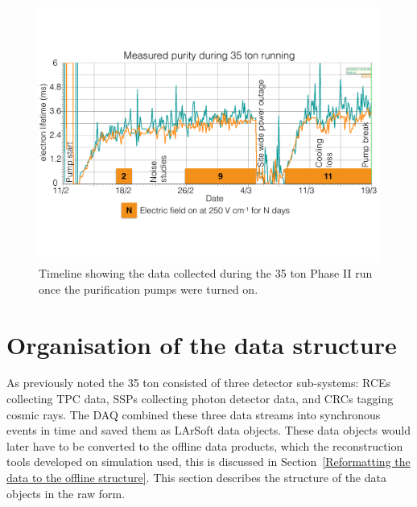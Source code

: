 \begin{figure}[h!]
  \centering
  \includegraphics[width=1.0\textwidth]{DataCollected}
  \caption[The 35 ton data sample]{Timeline showing the data collected during the 35 ton Phase II run once the purification pumps were turned on.}
  \label{fig:DataCollected}  
\end{figure}

\section{Organisation of the data structure} \label{Organisation of the data structure} %
As previously noted the 35 ton consisted of three detector sub-systems: RCEs collecting TPC data, SSPs collecting photon detector data, and CRCs tagging cosmic rays. The DAQ combined these three data streams into synchronous events in time and saved them as LArSoft data objects. These data objects would later have to be converted to the offline data products, which the reconstruction tools developed on simulation used, this is discussed in Section~\ref{Reformatting the data to the offline structure}. This section describes the structure of the data objects in the raw form.\\

